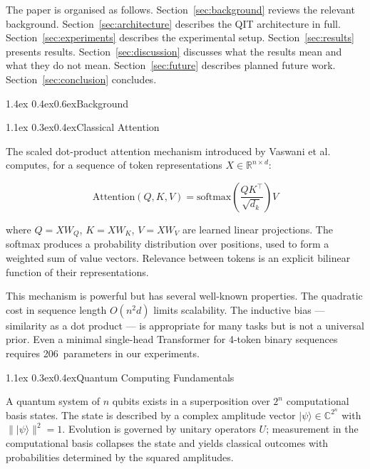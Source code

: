\documentclass[11pt,a4paper]{article}
\makeatletter
\renewcommand\section{\@startsection{section}{1}{\z@}%
  {1.4ex \@plus 0.4ex}{0.6ex}{\normalfont\large\bfseries}}
\renewcommand\subsection{\@startsection{subsection}{2}{\z@}%
  {1.1ex \@plus 0.3ex}{0.4ex}{\normalfont\normalsize\bfseries}}
\newcommand{\ket}[1]{|{#1}\rangle}
\makeatother
\begin{document}
The paper is organised as follows. Section~\ref{sec:background} reviews the relevant
background. Section~\ref{sec:architecture} describes the QIT architecture in full.
Section~\ref{sec:experiments} describes the experimental setup. Section~\ref{sec:results}
presents results. Section~\ref{sec:discussion} discusses what the results mean and what
they do not mean. Section~\ref{sec:future} describes planned future work.
Section~\ref{sec:conclusion} concludes.

\section{Background}
\label{sec:background}

\subsection{Classical Attention}

The scaled dot-product attention mechanism introduced by Vaswani et al.~\cite{vaswani2017attention}
computes, for a sequence of token representations $X \in \mathbb{R}^{n \times d}$:

\begin{equation}
  \text{Attention}(Q, K, V)
    = \text{softmax}\!\left(\frac{QK^\top}{\sqrt{d_k}}\right) V
  \label{eq:attention}
\end{equation}

where $Q = XW_Q$, $K = XW_K$, $V = XW_V$ are learned linear projections.
The softmax produces a probability distribution over positions, used to form a weighted
sum of value vectors. Relevance between tokens is an explicit bilinear function of
their representations.

This mechanism is powerful but has several well-known properties. The quadratic cost in
sequence length $O(n^2 d)$ limits scalability. The inductive bias --- similarity as a
dot product --- is appropriate for many tasks but is not a universal prior. Even a minimal
single-head Transformer for 4-token binary sequences requires 206~parameters in our experiments.

\subsection{Quantum Computing Fundamentals}

A quantum system of $n$ qubits exists in a superposition over $2^n$ computational basis
states. The state is described by a complex amplitude vector
$\ket{\psi} \in \mathbb{C}^{2^n}$ with $\|\ket{\psi}\|^2 = 1$. Evolution is governed by
unitary operators $U$; measurement in the computational basis collapses the state and
yields classical outcomes with probabilities determined by the squared amplitudes.
\end{document}
